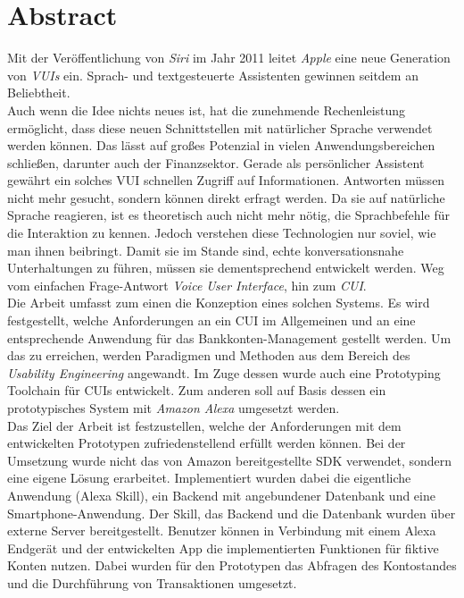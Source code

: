 \section*{Abstract}
\label{sec:zusammenfassung}
Mit der Veröffentlichung von \textit{Siri} im Jahr 2011 leitet \textit{Apple} eine neue Generation von \textit{\acp{VUI}} ein. Sprach- und textgesteuerte Assistenten gewinnen seitdem an Beliebtheit.\\ 
Auch wenn die Idee nichts neues ist, hat die zunehmende Rechenleistung ermöglicht, dass diese neuen Schnittstellen mit natürlicher Sprache verwendet werden können. Das lässt auf großes Potenzial in vielen Anwendungsbereichen schließen, darunter auch der Finanzsektor. Gerade als persönlicher Assistent gewährt ein solches \ac{VUI} schnellen Zugriff auf Informationen. Antworten müssen nicht mehr gesucht, sondern können direkt erfragt werden. Da sie auf natürliche Sprache reagieren, ist es theoretisch auch nicht mehr nötig, die Sprachbefehle für die Interaktion zu kennen. Jedoch verstehen diese Technologien nur soviel, wie man ihnen beibringt. Damit sie im Stande sind, echte konversationsnahe Unterhaltungen zu führen, müssen sie dementsprechend entwickelt werden. Weg vom einfachen Frage-Antwort \textit{Voice User Interface}, hin zum \textit{\ac{CUI}}.\\
Die Arbeit umfasst zum einen die Konzeption eines solchen Systems. Es wird festgestellt, welche Anforderungen an ein \ac{CUI} im Allgemeinen und an eine entsprechende Anwendung für das Bankkonten-Management gestellt werden. Um das zu erreichen, werden Paradigmen und Methoden aus dem Bereich des \textit{Usability Engineering} angewandt. Im Zuge dessen wurde auch eine Prototyping Toolchain für \acp{CUI} entwickelt. Zum anderen soll auf Basis dessen ein prototypisches System mit \textit{Amazon Alexa} \cite{amazon-developer-alexa} umgesetzt werden.\\
Das Ziel der Arbeit ist festzustellen, welche der Anforderungen mit dem entwickelten Prototypen zufriedenstellend erfüllt werden können. Bei der Umsetzung wurde nicht das von Amazon bereitgestellte \ac{SDK} \cite{alexa-sdk} verwendet, sondern eine eigene Lösung erarbeitet. Implementiert wurden dabei die eigentliche Anwendung (Alexa Skill), ein Backend mit angebundener Datenbank und eine Smartphone-Anwendung. Der Skill, das Backend und die Datenbank wurden über externe Server bereitgestellt. Benutzer können in Verbindung mit einem Alexa Endgerät und der entwickelten App die implementierten Funktionen für fiktive Konten nutzen. Dabei wurden für den Prototypen das Abfragen des Kontostandes und die Durchführung von Transaktionen umgesetzt. 